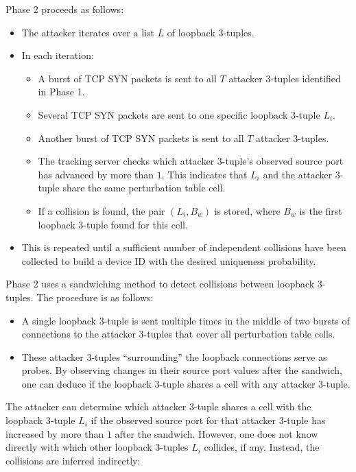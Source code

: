 \documentclass{report}
\begin{document}
Phase 2 proceeds as follows:

\begin{itemize}
	\item The attacker iterates over a list $L$ of loopback 3-tuples.
	\item In each iteration:
	\begin{itemize}
		\item A burst of TCP SYN packets is sent to all $T$ attacker 3-tuples identified in Phase 1.
		\item Several TCP SYN packets are sent to one specific loopback 3-tuple $L_i$.
		\item Another burst of TCP SYN packets is sent to all $T$ attacker 3-tuples.
		\item The tracking server checks which attacker 3-tuple’s observed source port has advanced by more than $1$. This indicates that $L_i$ and the attacker 3-tuple share the same perturbation table cell.
		\item If a collision is found, the pair $(L_i, B_w)$ is stored, where $B_w$ is the first loopback 3-tuple found for this cell.
	\end{itemize}
	\item This is repeated until a sufficient number of independent collisions have been collected to build a device ID with the desired uniqueness probability.
\end{itemize}

Phase 2 uses a \alert{sandwiching method} to detect collisions between loopback 3-tuples. The procedure is as follows:

\begin{itemize}
	\item A single loopback 3-tuple is sent multiple times in the middle of two bursts of connections to the attacker 3-tuples that cover all perturbation table cells.
	\item These attacker 3-tuples “surrounding” the loopback connections serve as probes. By observing changes in their source port values after the sandwich, one can deduce if the loopback 3-tuple shares a cell with any attacker 3-tuple.
\end{itemize}

The attacker can determine which attacker 3-tuple shares a cell with the loopback 3-tuple $L_i$ if the observed source port for that attacker 3-tuple has increased by more than $1$ after the sandwich. However, one does not know directly with which other loopback 3-tuples $L_i$ collides, if any. Instead, the collisions are inferred indirectly:
\end{document}
